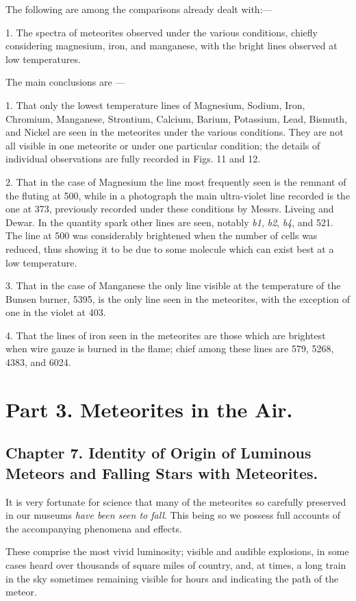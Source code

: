 \documentclass[a4paper, 12pt, oneside, polutonikogreek, english]{article}
\begin{document}
The following are among the comparisons already dealt with:---

1. The spectra of meteorites observed under the various conditions, chiefly considering magnesium, iron, and manganese, with the bright lines observed at low temperatures.

The main conclusions are ---

1. That only the lowest temperature lines of Magnesium, Sodium, Iron, Chromium, Manganese, Strontium, Calcium, Barium, Potassium, Lead, Bismuth, and Nickel are seen in the meteorites under the various conditions. They are not all visible in one meteorite or under one particular condition; the details of individual observations are fully recorded in Figs. 11 and 12.

2. That in the case of Magnesium the line most frequently seen is the remnant of the fluting at 500, while in a photograph the main ultra-violet line recorded is the one at 373, previously recorded under these conditions by Messrs. Liveing and Dewar. In the quantity spark other lines are seen, notably \emph{b1}, \emph{b2}, \emph{b4}, and 521. The line at 500 was considerably brightened when the number of cells was reduced, thus showing it to be due to some molecule which can exist best at a low temperature.

3. That in the case of Manganese the only line visible at the temperature of the Bunsen burner, 5395, is the only line seen in the meteorites, with the exception of one in the violet at 403.

4. That the lines of iron seen in the meteorites are those which are brightest when wire gauze is burned in the flame; chief among these lines are 579, 5268, 4383, and 6024.

\section{Part 3. Meteorites in the Air.}

\subsection{Chapter 7. Identity of Origin of Luminous Meteors and Falling Stars with Meteorites.}

It is very fortunate for science that many of the meteorites so carefully preserved in our museums \emph{have been seen to fall}. This being so we possess full accounts of the accompanying phenomena and effects.

These comprise the most vivid luminosity; visible and audible explosions, in some cases heard over thousands of square miles of country, and, at times, a long train in the sky sometimes remaining visible for hours and indicating the path of the meteor.
\end{document}

